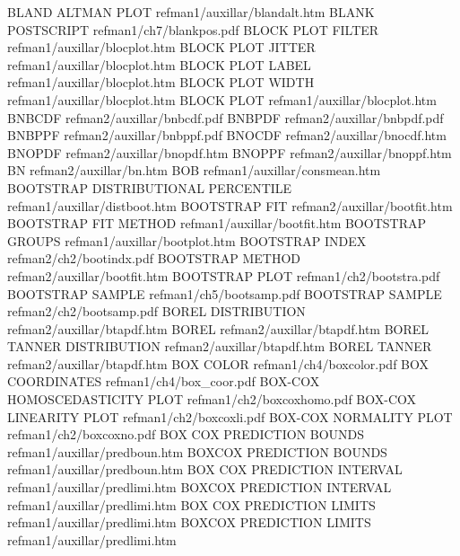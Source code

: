 BLAND ALTMAN PLOT                       refman1/auxillar/blandalt.htm
BLANK POSTSCRIPT                        refman1/ch7/blankpos.pdf
BLOCK PLOT FILTER                       refman1/auxillar/blocplot.htm
BLOCK PLOT JITTER                       refman1/auxillar/blocplot.htm
BLOCK PLOT LABEL                        refman1/auxillar/blocplot.htm
BLOCK PLOT WIDTH                        refman1/auxillar/blocplot.htm
BLOCK PLOT                              refman1/auxillar/blocplot.htm
BNBCDF                                  refman2/auxillar/bnbcdf.pdf
BNBPDF                                  refman2/auxillar/bnbpdf.pdf
BNBPPF                                  refman2/auxillar/bnbppf.pdf
BNOCDF                                  refman2/auxillar/bnocdf.htm
BNOPDF                                  refman2/auxillar/bnopdf.htm
BNOPPF                                  refman2/auxillar/bnoppf.htm
BN                                      refman2/auxillar/bn.htm
BOB                                     refman1/auxillar/consmean.htm
BOOTSTRAP DISTRIBUTIONAL PERCENTILE     refman1/auxillar/distboot.htm
BOOTSTRAP FIT                           refman2/auxillar/bootfit.htm
BOOTSTRAP FIT METHOD                    refman1/auxillar/bootfit.htm
BOOTSTRAP GROUPS                        refman1/auxillar/bootplot.htm
BOOTSTRAP INDEX                         refman2/ch2/bootindx.pdf
BOOTSTRAP METHOD                        refman2/auxillar/bootfit.htm
BOOTSTRAP PLOT                          refman1/ch2/bootstra.pdf
BOOTSTRAP SAMPLE                        refman1/ch5/bootsamp.pdf
BOOTSTRAP SAMPLE                        refman2/ch2/bootsamp.pdf
BOREL DISTRIBUTION                      refman2/auxillar/btapdf.htm
BOREL                                   refman2/auxillar/btapdf.htm
BOREL TANNER DISTRIBUTION               refman2/auxillar/btapdf.htm
BOREL TANNER                            refman2/auxillar/btapdf.htm
BOX COLOR                               refman1/ch4/boxcolor.pdf
BOX COORDINATES                         refman1/ch4/box_coor.pdf
BOX-COX HOMOSCEDASTICITY PLOT           refman1/ch2/boxcoxhomo.pdf
BOX-COX LINEARITY PLOT                  refman1/ch2/boxcoxli.pdf
BOX-COX NORMALITY PLOT                  refman1/ch2/boxcoxno.pdf
BOX COX PREDICTION BOUNDS               refman1/auxillar/predboun.htm
BOXCOX PREDICTION BOUNDS                refman1/auxillar/predboun.htm
BOX COX PREDICTION INTERVAL             refman1/auxillar/predlimi.htm
BOXCOX PREDICTION INTERVAL              refman1/auxillar/predlimi.htm
BOX COX PREDICTION LIMITS               refman1/auxillar/predlimi.htm
BOXCOX PREDICTION LIMITS                refman1/auxillar/predlimi.htm
